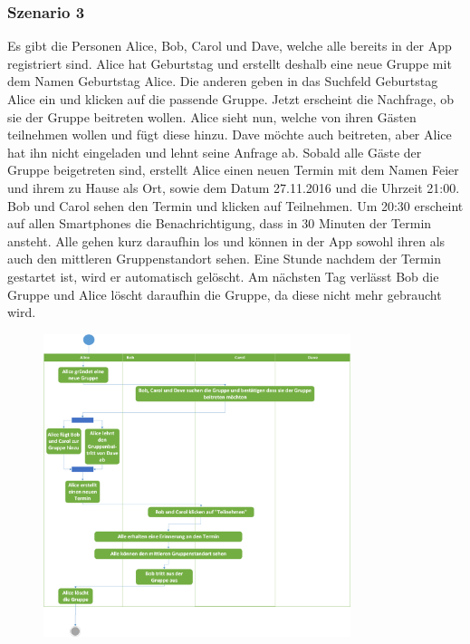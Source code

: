 \documentclass{scrartcl}
\begin{document}
	\subsubsection{Szenario 3}
	Es gibt die Personen Alice, Bob, Carol und Dave, welche alle bereits in der App registriert sind.
	Alice hat Geburtstag und erstellt deshalb eine neue Gruppe mit dem Namen \glqq{}Geburtstag Alice\grqq{}. Die anderen geben in das Suchfeld \glqq{}Geburtstag Alice\grqq{} ein und klicken auf die passende Gruppe.
	Jetzt erscheint die Nachfrage, ob sie der Gruppe beitreten wollen. Alice sieht nun, welche von ihren Gästen teilnehmen wollen und fügt diese hinzu. Dave möchte auch beitreten, aber Alice hat ihn nicht eingeladen und lehnt seine Anfrage ab.
	Sobald alle Gäste der Gruppe beigetreten sind, erstellt Alice einen neuen Termin mit dem Namen \glqq{}Feier\grqq{} und ihrem zu Hause als Ort, sowie dem Datum \glqq{}27.11.2016\grqq{} und die Uhrzeit \glqq{}21:00\grqq{}.
	Bob und Carol sehen den Termin und klicken auf \glqq{}Teilnehmen\grqq{}.
	Um 20:30 erscheint auf allen Smartphones die Benachrichtigung, dass in 30 Minuten der Termin ansteht. Alle gehen kurz daraufhin los und können in der App sowohl ihren als auch den mittleren Gruppenstandort sehen.
	Eine Stunde nachdem der Termin gestartet ist, wird er automatisch gelöscht.
	Am nächsten Tag verlässt Bob die Gruppe und Alice löscht daraufhin die Gruppe, da diese nicht mehr gebraucht wird.	
	\newline
	\newline
	\begin{figure}[h]
		\centering
		\includegraphics[width=0.8\textwidth]{Szenario3}
	\end{figure}
	\newpage
	
\end{document}

